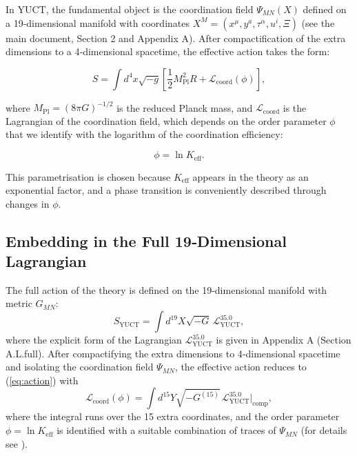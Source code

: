 \documentclass[12pt]{article}
\theoremstyle{remark}
\newcommand{\Keff}{K_{\mathrm{eff}}}
\newcommand{\Mpl}{M_{\mathrm{Pl}}}
\begin{document}
	In YUCT, the fundamental object is the coordination field $\Psi_{MN}(X)$ defined on a 19‑dimensional manifold with coordinates $X^M = (x^\mu, y^a, \tau^\alpha, u^i, \Xi)$ (see the main document, Section 2 and Appendix A). After compactification of the extra dimensions to a 4‑dimensional spacetime, the effective action takes the form:
	
	\begin{equation}
		S = \int d^4x \sqrt{-g} \left[ \frac{1}{2} \Mpl^2 R + \mathcal{L}_{\mathrm{coord}}(\phi) \right],
		\label{eq:action}
	\end{equation}
	
	where $\Mpl = (8\pi G)^{-1/2}$ is the reduced Planck mass, and $\mathcal{L}_{\mathrm{coord}}$ is the Lagrangian of the coordination field, which depends on the order parameter $\phi$ that we identify with the logarithm of the coordination efficiency:
	
	\begin{equation}
		\phi = \ln \Keff.
		\label{eq:phi-def}
	\end{equation}
	
	This parametrisation is chosen because $\Keff$ appears in the theory as an exponential factor, and a phase transition is conveniently described through changes in $\phi$.
	
	\subsection{Embedding in the Full 19‑Dimensional Lagrangian}
	
	The full action of the theory is defined on the 19‑dimensional manifold with metric $G_{MN}$:
	\begin{equation}
		S_{\text{YUCT}} = \int d^{19}X \sqrt{-G} \, \mathcal{L}_{\text{YUCT}}^{35.0},
		\label{eq:full-action}
	\end{equation}
	where the explicit form of the Lagrangian $\mathcal{L}_{\text{YUCT}}^{35.0}$ is given in Appendix A (Section A.L.full). After compactifying the extra dimensions to 4‑dimensional spacetime and isolating the coordination field $\Psi_{MN}$, the effective action reduces to (\ref{eq:action}) with
	\begin{equation}
		\mathcal{L}_{\mathrm{coord}}(\phi) = \int d^{15}Y \sqrt{-G^{(15)}} \, \mathcal{L}_{\text{YUCT}}^{35.0}\big|_{\text{comp}},
	\end{equation}
	where the integral runs over the 15 extra coordinates, and the order parameter $\phi = \ln\Keff$ is identified with a suitable combination of traces of $\Psi_{MN}$ (for details see \cite{Yakushev2026}).
	
\end{document}
